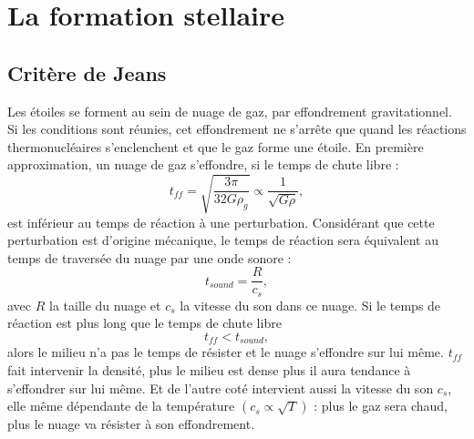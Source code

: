


\section{La formation stellaire}

\subsection{Critère de Jeans}


Les étoiles se forment au sein de nuage de gaz, par effondrement gravitationnel.
Si les conditions sont réunies, cet effondrement ne s'arrête que quand les réactions thermonucléaires s'enclenchent et que le gaz forme une étoile.
En première approximation, un nuage de gaz s'effondre, si le temps de chute libre : 
\begin{equation}
t_{ff} =  \sqrt{\frac{3\pi}{32G\rho_g}} \propto \frac{1}{\sqrt{G \rho}},
\label{eq:tff}
\end{equation}
est inférieur au temps de réaction à une perturbation.
Considérant que cette perturbation est d'origine mécanique, le temps de réaction sera équivalent au temps de traversée du nuage par une onde sonore :
 \begin{equation}
t_{sound} = \frac{R}{c_s},
\end{equation}
avec $R$ la taille du nuage et $c_s$ la vitesse du son dans ce nuage.
Si le temps de réaction est plus long que le temps de chute libre
\begin{equation}
t_{ff} < t_{sound},
\end{equation}
alors le milieu n'a pas le temps de résister et le nuage s'effondre sur lui même.
$t_{ff}$ fait intervenir la densité, plus le milieu est dense plus il aura tendance à s'effondrer sur lui même.
Et de l'autre coté intervient aussi la vitesse du son $c_s$, elle même dépendante de la température $\left( c_s \propto \sqrt{T} \right)$ : plus le gaz sera chaud, plus le nuage va résister à son effondrement.


